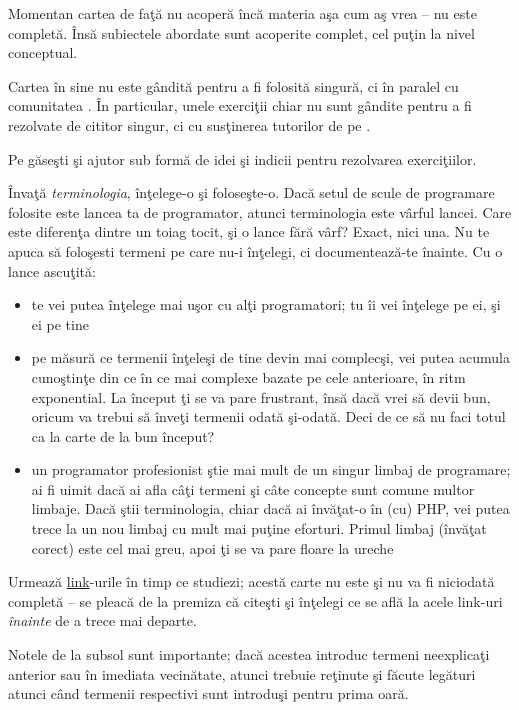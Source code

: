 Momentan cartea de faţă nu acoperă încă materia aşa cum aş vrea -- nu este completă.
Însă subiectele abordate sunt acoperite complet, cel puţin la nivel conceptual.

Cartea în sine nu este gândită pentru a fi folosită singură, ci
în paralel cu comunitatea \phpro. În particular, unele exerciţii
chiar nu sunt gândite pentru a fi rezolvate de cititor singur,
ci cu susţinerea tutorilor de pe \phpro.

Pe {\phpro} găseşti şi ajutor sub formă de idei şi indicii pentru rezolvarea
exerciţiilor.

Învaţă \textit{terminologia}, înţelege-o şi foloseşte-o. Dacă setul de scule de programare folosite
este lancea ta de programator, atunci terminologia este vârful lancei.
Care este diferenţa dintre un toiag tocit, şi o lance fără vârf?
Exact, nici una. Nu te apuca să foloşesti termeni pe care nu-i înţelegi,
ci documentează-te înainte. Cu o lance ascuţită:
\begin{itemize}
	\item te vei putea înţelege mai uşor cu alţi programatori; tu îi vei înţelege pe ei, şi ei pe tine
	\item pe măsură ce termenii înţeleşi de tine devin mai complecşi,
		  vei putea acumula cunoştinţe din ce în ce mai complexe bazate pe cele anterioare,
		  în ritm exponential. La început ţi se va pare frustrant, însă dacă vrei să devii bun,
		  oricum va trebui să înveţi termenii odată şi-odată. Deci de ce să nu faci totul ca
		  la carte de la bun început?
	\item un programator profesionist ştie mai mult de un singur limbaj de programare; ai fi
		  uimit dacă ai afla câţi termeni şi câte concepte sunt comune multor limbaje. Dacă
		  ştii terminologia, chiar dacă ai învăţat-o în (cu) PHP, vei putea trece la un nou
		  limbaj cu mult mai puţine eforturi. Primul limbaj (învăţat corect) este cel mai greu,
		  apoi ţi se va pare floare la ureche
\end{itemize}


Urmează \href{http://en.wikipedia.org/wiki/Hyperlink}{link}-urile în timp ce
studiezi;
acestă carte nu este şi nu va fi niciodată {\glqq}completă{\grqq} -- se pleacă de la premiza
că citeşti şi înţelegi ce se află la acele link-uri \textit{înainte} de a trece
mai departe.

Notele de la subsol sunt importante; dacă acestea introduc termeni neexplicaţi
anterior sau în imediata vecinătate, atunci trebuie reţinute şi făcute
legături atunci când termenii respectivi sunt introduşi pentru prima oară.

